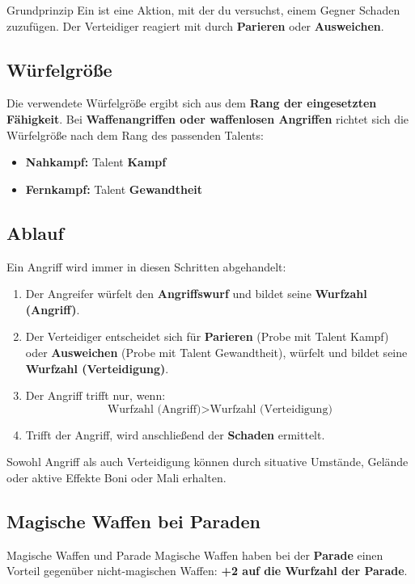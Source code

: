 \begin{rulebox}{Grundprinzip}
	Ein  ist eine Aktion, mit der du versuchst, einem Gegner Schaden zuzufügen.
	Der Verteidiger reagiert mit  durch \textbf{Parieren} oder \textbf{Ausweichen}.
\end{rulebox}

\subsection*{Würfelgröße}
Die verwendete Würfelgröße ergibt sich aus dem \textbf{Rang der eingesetzten Fähigkeit}.
Bei \textbf{Waffenangriffen oder waffenlosen Angriffen} richtet sich die Würfelgröße nach dem Rang des passenden Talents:
\begin{itemize}
	\item \textbf{Nahkampf:} Talent \textbf{Kampf}
	\item \textbf{Fernkampf:} Talent \textbf{Gewandtheit}
\end{itemize}

\subsection*{Ablauf}
Ein Angriff wird immer in diesen Schritten abgehandelt:
\begin{enumerate}
	\item Der Angreifer würfelt den \textbf{Angriffswurf} und bildet seine \textbf{Wurfzahl (Angriff)}.
	\item Der Verteidiger entscheidet sich für \textbf{Parieren} (Probe mit Talent Kampf) oder \textbf{Ausweichen} (Probe mit Talent Gewandtheit), würfelt und bildet seine \textbf{Wurfzahl (Verteidigung)}.
	\item Der Angriff trifft nur, wenn:
	\[
	\text{Wurfzahl (Angriff)} > \text{Wurfzahl (Verteidigung)}
	\]
	\item Trifft der Angriff, wird anschließend der \textbf{Schaden} ermittelt.
\end{enumerate}

Sowohl Angriff als auch Verteidigung können durch situative Umstände,
Gelände oder aktive Effekte Boni oder Mali erhalten.

\subsection*{Magische Waffen bei Paraden}

\begin{rulebox}{Magische Waffen und Parade}
	Magische Waffen haben bei der \textbf{Parade} einen Vorteil gegenüber nicht-magischen Waffen:
	\textbf{+2 auf die Wurfzahl der Parade}.
\end{rulebox}

